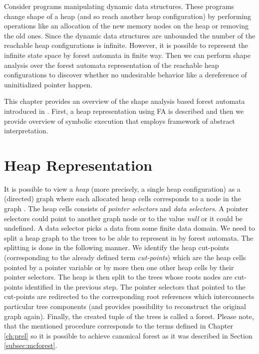 Consider programs manipulating dynamic data structures.
These programs change shape of a heap (and so reach another heap configuration)
by performing operations like an allocation of the new memory nodes on the heap
or removing the old ones.
Since the dynamic data structures are unbounded the number of
the reachable heap configurations is infinite.
However, it is possible to represent the infinite state space by forest automata in finite way.
Then we can perform shape analysis over the forest automata representation of the reachable
heap configurations to discover whether no undesirable behavior like a dereference of uninitialized
pointer happen.

This chapter provides an overview of the shape analysis based forest automata introduced in \cite{forester12}.
First, a heap representation using FA is described and then
we provide overview of symbolic execution that employs framework of abstract interpretation.

\section{Heap Representation}
\label{sec:hd}

It is possible to view a \emph{heap} (more precisely, a single heap configuration)
as a (directed) graph where each allocated heap cells corresponds to a node in the graph \cite{forester13}.
The heap cells consists of \emph{pointer selectors} and \emph{data selectors}.
A pointer selectors could point to another graph node or to the value \emph{null} or it could be undefined.
A data selector picks a data from some finite data domain.
We need to split a heap graph to the trees to be able to represent in by forest automata.
The splitting is done in the following manner.
We identify the heap cut-points (corresponding to the already defined term \emph{cut-points})
which are the heap cells pointed by a pointer variable or by more then one other heap cells by their pointer selectors.
The heap is then split to the trees whose roots nodes are cut-points identified in the previous step.
The pointer selectors that pointed to the cut-points are redirected to the corresponding root references which interconnects
particular tree components (and provides possibility to reconstruct the original graph again).
Finally, the created tuple of the trees is called a forest.
Please note, that the mentioned procedure corresponds to the terms defined in Chapter \ref{ch:prel}
so it is possible to achieve canonical forest as it was described in Section \ref{subsec:mcforest}.

